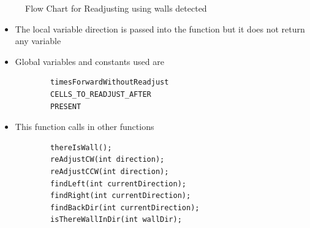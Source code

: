 \documentclass[11pt]{article}
\begin{document}
\begin{itemize}
\begin{figure}[htp]
\caption{Flow Chart for Readjusting using walls detected}
\label{}
\end{figure}
	\begin{itemize}
	\item The local variable direction is passed into the function but it does not return any variable
	\item Global variables and constants used are
	\begin{verbatim}
		timesForwardWithoutReadjust
		CELLS_TO_READJUST_AFTER
		PRESENT
	\end{verbatim}
	\item This function calls in other functions
	\begin{verbatim}
		thereIsWall();
		reAdjustCW(int direction);
		reAdjustCCW(int direction);
		findLeft(int currentDirection);
		findRight(int currentDirection);
		findBackDir(int currentDirection);
		isThereWallInDir(int wallDir);
	\end{verbatim}
	\end{itemize}
\end{itemize}
\newpage

\end{document}
